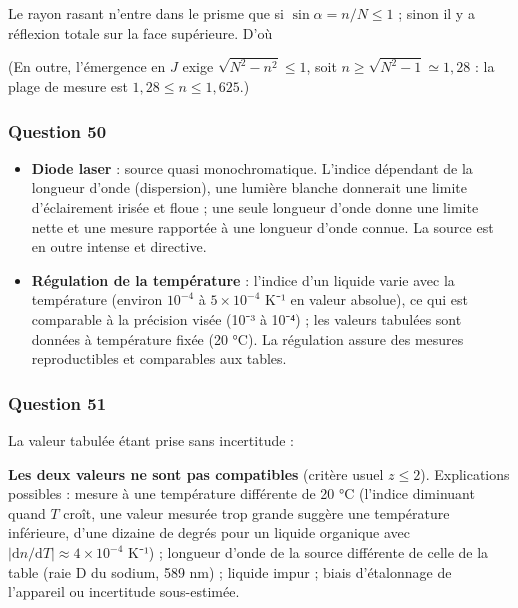\documentclass[11pt,a4paper]{article}
\providecommand{\tightlist}{\setlength{\itemsep}{0pt}\setlength{\parskip}{0pt}}
\newcommand{\equationajustee}[1]{%
  \sbox{\boiteequation}{$\displaystyle #1$}%
  \ifdim\wd\boiteequation>\linewidth
    \[\resizebox{\linewidth}{!}{\usebox{\boiteequation}}\]%
  \else
    \[#1\]%
  \fi}
\begin{document}
Le rayon rasant n'entre dans le prisme que si \(\sin\alpha=n/N\le1\) ; sinon il y a réflexion totale sur la face supérieure. D'où

\equationajustee{\boxed{n_{\max}=N=1{,}625}}

(En outre, l'émergence en \(J\) exige \(\sqrt{N^2-n^2}\le1\), soit \(n\ge\sqrt{N^2-1}\simeq1{,}28\) : la plage de mesure est \(1{,}28\le n\le1{,}625\).)

\hypertarget{question-50}{%
\subsubsection{Question 50}\label{question-50}}

\begin{itemize}
\tightlist
\item
  \textbf{Diode laser} : source quasi monochromatique. L'indice dépendant de la longueur d'onde (dispersion), une lumière blanche donnerait une limite d'éclairement irisée et floue ; une seule longueur d'onde donne une limite nette et une mesure rapportée à une longueur d'onde connue. La source est en outre intense et directive.
\item
  \textbf{Régulation de la température} : l'indice d'un liquide varie avec la température (environ \(10^{-4}\) à \(5\times10^{-4}\) K⁻¹ en valeur absolue), ce qui est comparable à la précision visée (10⁻³ à 10⁻⁴) ; les valeurs tabulées sont données à température fixée (20 °C). La régulation assure des mesures reproductibles et comparables aux tables.
\end{itemize}

\hypertarget{question-51}{%
\subsubsection{Question 51}\label{question-51}}

La valeur tabulée étant prise sans incertitude :

\equationajustee{\begin{aligned}
z&=\frac{|n-n'|}{u(n)}\\
&=\frac{|1{,}4100-1{,}4060|}{1{,}1\times10^{-3}}\\
&\Longrightarrow\quad\boxed{z\simeq3{,}6>2}
\end{aligned}}

\textbf{Les deux valeurs ne sont pas compatibles} (critère usuel \(z\le2\)). Explications possibles : mesure à une température différente de 20 °C (l'indice diminuant quand \(T\) croît, une valeur mesurée trop grande suggère une température inférieure, d'une dizaine de degrés pour un liquide organique avec \(|\mathrm dn/\mathrm dT|\approx4\times10^{-4}\) K⁻¹) ; longueur d'onde de la source différente de celle de la table (raie D du sodium, 589 nm) ; liquide impur ; biais d'étalonnage de l'appareil ou incertitude sous-estimée.
\end{document}
